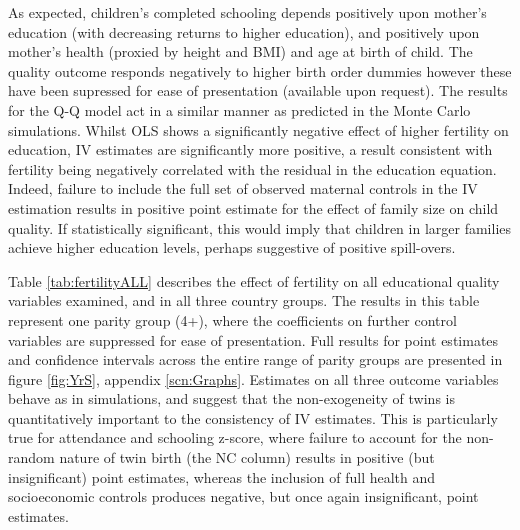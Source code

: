 \documentclass{article}[11pt,subeqn]
\begin{document}
\begin{spacing}{1.5}

As expected, children's completed schooling depends positively upon mother's education (with decreasing returns to higher education), 
and positively upon mother's health (proxied by height and BMI) and age at birth of child.  The quality outcome responds negatively to higher birth order dummies
however these have been supressed for ease of presentation (available upon request).  The results for the Q-Q model act in a similar manner as predicted in the Monte
Carlo simulations.  Whilst OLS shows a significantly negative effect of higher fertility on education, IV estimates are significantly more positive, a result consistent with
fertility being negatively correlated with the residual in the education equation.  Indeed, failure to 
include the full set of observed maternal controls in the IV estimation results in positive point estimate for the effect of family size on child quality. 
If statistically significant, this would imply that children in larger families achieve higher education levels, perhaps suggestive of positive spill-overs. 


Table \ref{tab:fertilityALL} describes the effect of fertility on all educational quality variables examined, and in all three country groups.  The results in this table 
represent one parity group (4+), where the coefficients on further control variables are suppressed for ease of presentation.  Full results for point estimates and 
confidence intervals across the entire range of parity groups are presented in figure \ref{fig:YrS}, appendix \ref{scn:Graphs}. Estimates on all three outcome 
variables behave as in simulations, and suggest that the non-exogeneity of twins is quantitatively important to the consistency of IV estimates.  This is particularly 
true for attendance and schooling z-score, where failure to account for the non-random nature of twin birth (the NC column) results in positive (but insignificant) 
point estimates, whereas the inclusion of full health and socioeconomic controls produces negative, but once again insignificant, point estimates.



\end{spacing}
\end{document}
